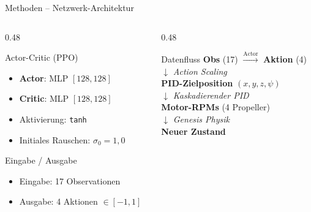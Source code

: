 \begin{frame}{Methoden -- Netzwerk-Architektur}
\begin{columns}[T]
\begin{column}{0.48\textwidth}
  \begin{block}{Actor-Critic (PPO)}
    \begin{itemize}
      \item \textbf{Actor}: MLP $[128, 128]$
      \item \textbf{Critic}: MLP $[128, 128]$
      \item Aktivierung: \texttt{tanh}
      \item Initiales Rauschen: $\sigma_0 = 1{,}0$
    \end{itemize}
  \end{block}
  \vspace{0.2cm}
  \begin{block}{Eingabe / Ausgabe}
    \begin{itemize}
      \item Eingabe: 17 Observationen
      \item Ausgabe: 4 Aktionen $\in [-1, 1]$
    \end{itemize}
  \end{block}
\end{column}
\begin{column}{0.48\textwidth}
  \begin{exampleblock}{Datenfluss}
    \small
    \textbf{Obs} (17) $\xrightarrow{\text{Actor}}$ \textbf{Aktion} (4)\\
    \vspace{0.3em}
    $\downarrow$ \textit{Action Scaling}\\
    \vspace{0.3em}
    \textbf{PID-Zielposition} $(x, y, z, \psi)$\\
    \vspace{0.3em}
    $\downarrow$ \textit{Kaskadierender PID}\\
    \vspace{0.3em}
    \textbf{Motor-RPMs} (4 Propeller)\\
    \vspace{0.3em}
    $\downarrow$ \textit{Genesis Physik}\\
    \vspace{0.3em}
    \textbf{Neuer Zustand}
  \end{exampleblock}
\end{column}
\end{columns}
\end{frame}


